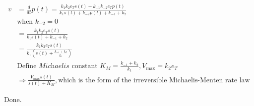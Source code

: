 \documentclass[8pt, fleqn]{report}
\begin{document}
\begin{align*}
    v & = \frac{d}{d t} p(t) = \frac{k_1 k_2 e_T s(t) - k_{-1} k_{-2} e_T p(t)}{k_1 s(t) + k_{-2} p(t) + k_{-1} + k_2}       \\
      & \text{when } k_{-2} = 0                                                                                              \\
      & = \frac{k_1 k_2 e_T s(t)}{k_1 s(t) + k_{-1} + k_2}                                                                   \\
      & = \frac{k_1 k_2 e_T s(t)}{k_1 \left(s(t) + \frac{k_{-1} + k_2}{k_1}\right)}                                          \\
      & \text{Define } \textit{Michaelis } \text{constant } K_M = \frac{k_{-1} + k_2}{k_1} , V_{\max} = k_2 e_T              \\
      & \Rightarrow \frac{V_{\max} s(t)}{s(t) + K_M}, \text{which is the form of the irreversible Michaelis-Menten rate law}
\end{align*}

Done.
\end{document}
